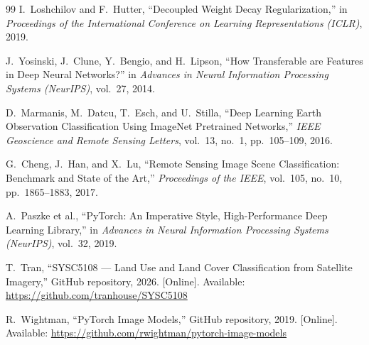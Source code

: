 \documentclass[12pt, letterpaper]{article}
\begin{document}
\begin{thebibliography}{99}
I.\ Loshchilov and F.\ Hutter,
``Decoupled Weight Decay Regularization,''
in \textit{Proceedings of the International Conference on Learning Representations
(ICLR)}, 2019.

J.\ Yosinski, J.\ Clune, Y.\ Bengio, and H.\ Lipson,
``How Transferable are Features in Deep Neural Networks?''
in \textit{Advances in Neural Information Processing Systems (NeurIPS)},
vol.\ 27, 2014.

D.\ Marmanis, M.\ Datcu, T.\ Esch, and U.\ Stilla,
``Deep Learning Earth Observation Classification Using ImageNet Pretrained
Networks,''
\textit{IEEE Geoscience and Remote Sensing Letters},
vol.\ 13, no.\ 1, pp.\ 105--109, 2016.

G.\ Cheng, J.\ Han, and X.\ Lu,
``Remote Sensing Image Scene Classification: Benchmark and State of the Art,''
\textit{Proceedings of the IEEE}, vol.\ 105, no.\ 10, pp.\ 1865--1883, 2017.

A.\ Paszke et al.,
``PyTorch: An Imperative Style, High-Performance Deep Learning Library,''
in \textit{Advances in Neural Information Processing Systems (NeurIPS)},
vol.\ 32, 2019.

T.\ Tran,
``SYSC5108 --- Land Use and Land Cover Classification from Satellite Imagery,''
GitHub repository, 2026.
[Online]. Available: \url{https://github.com/tranhouse/SYSC5108}

R.\ Wightman,
``PyTorch Image Models,''
GitHub repository, 2019.
[Online]. Available: \url{https://github.com/rwightman/pytorch-image-models}

\end{thebibliography}
\end{document}
